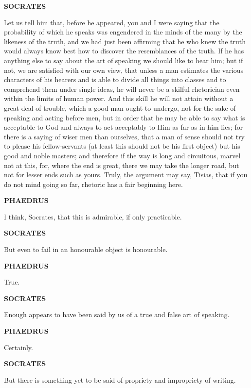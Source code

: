 \documentclass[11pt,letter]{article}
\begin{document}
\par \textbf{SOCRATES}
\par   Let us tell him that, before he appeared, you and I were saying that the probability of which he speaks was engendered in the minds of the many by the likeness of the truth, and we had just been affirming that he who knew the truth would always know best how to discover the resemblances of the truth. If he has anything else to say about the art of speaking we should like to hear him; but if not, we are satisfied with our own view, that unless a man estimates the various characters of his hearers and is able to divide all things into classes and to comprehend them under single ideas, he will never be a skilful rhetorician even within the limits of human power. And this skill he will not attain without a great deal of trouble, which a good man ought to undergo, not for the sake of speaking and acting before men, but in order that he may be able to say what is acceptable to God and always to act acceptably to Him as far as in him lies; for there is a saying of wiser men than ourselves, that a man of sense should not try to please his fellow-servants (at least this should not be his first object) but his good and noble masters; and therefore if the way is long and circuitous, marvel not at this, for, where the end is great, there we may take the longer road, but not for lesser ends such as yours. Truly, the argument may say, Tisias, that if you do not mind going so far, rhetoric has a fair beginning here.

\par \textbf{PHAEDRUS}
\par   I think, Socrates, that this is admirable, if only practicable.

\par \textbf{SOCRATES}
\par   But even to fail in an honourable object is honourable.

\par \textbf{PHAEDRUS}
\par   True.

\par \textbf{SOCRATES}
\par   Enough appears to have been said by us of a true and false art of speaking.

\par \textbf{PHAEDRUS}
\par   Certainly.

\par \textbf{SOCRATES}
\par   But there is something yet to be said of propriety and impropriety of writing.
\end{document}
